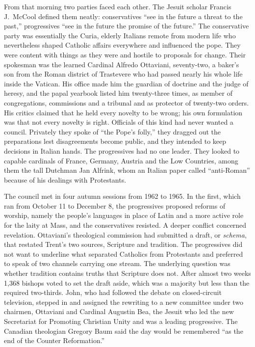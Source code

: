 From that morning two parties faced each other. The Jesuit scholar Francis J.~McCool defined them
neatly: conservatives ``see in the future a threat to the past,'' progressives ``see in the future
the promise of the future.'' The conservative party was essentially the Curia, elderly Italians
remote from modern life who nevertheless shaped Catholic affairs everywhere and influenced the pope.
They were content with things as they were and hostile to proposals for change. Their spokesman was
the learned Cardinal Alfredo Ottaviani, seventy-two, a baker's son from the Roman district of
Trastevere who had passed nearly his whole life inside the Vatican. His office made him the guardian
of doctrine and the judge of heresy, and the papal yearbook listed him twenty-three times, as member
of congregations, commissions and a tribunal and as protector of twenty-two orders. His critics
claimed that he held every novelty to be wrong; his own formulation was that not every novelty is
right. Officials of this kind had never wanted a council. Privately they spoke of ``the Pope's
folly,'' they dragged out the preparations lest disagreements become public, and they intended to
keep decisions in Italian hands. The progressives had no one leader. They looked to capable cardinals of France, Germany, Austria and the Low Countries, among them the tall Dutchman Jan Alfrink, whom
an Italian paper called ``anti-Roman'' because of his dealings with Protestants.

The council met in four autumn sessions from 1962 to 1965. In the first, which ran from October 11
to December 8, the progressives proposed reforms of worship, namely the people's languages in place
of Latin and a more active role for the laity at Mass, and the conservatives resisted. A deeper
conflict concerned revelation. Ottaviani's theological commission had submitted a draft, or
\emph{schema}, that restated Trent's two sources, Scripture and tradition. The progressives did not
want to underline what separated Catholics from Protestants and preferred to speak of two channels
carrying one stream. The underlying question was whether tradition contains truths that Scripture
does not. After almost two weeks 1,368 bishops voted to set the draft aside, which was a majority but
less than the required two-thirds. John, who had followed the debate on closed-circuit television,
stepped in and assigned the rewriting to a new committee under two chairmen, Ottaviani and Cardinal
Augustin Bea, the Jesuit who led the new Secretariat for Promoting Christian Unity and was a leading
progressive. The Canadian theologian Gregory Baum said the day would be remembered ``as the end of
the Counter Reformation.''


